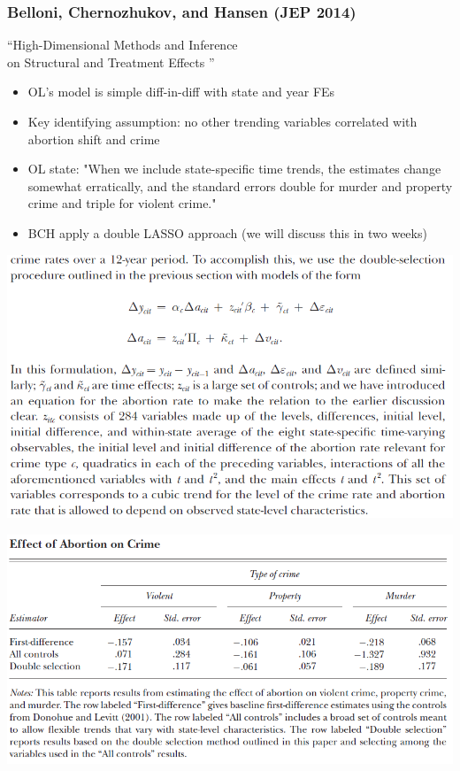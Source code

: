 \begin{frame}
    \frametitle{Belloni, Chernozhukov, and Hansen (JEP 2014)}
    \nocite{belloniJEP}
    ``High-Dimensional Methods and Inference \\ on Structural and Treatment Effects ''

\begin{itemize}
    \item OL's model is simple diff-in-diff with state and year FEs
    \item Key identifying assumption: no other trending variables correlated with abortion shift and crime
    \item OL state: "When we include state-specific time trends, the estimates change somewhat erratically, and the standard errors double for murder and property crime and triple for violent crime."
    \item BCH apply a double LASSO approach (we will discuss this in two weeks) 
\end{itemize}
\end{frame}

\begin{frame}
    \vspace{-10pt}
    \begin{center}
    \includegraphics[width=\textwidth]{./resources/BCHLevittVars}
    \end{center}
\end{frame}

\begin{frame}
    \vspace{-10pt}
    \begin{center}
    \includegraphics[width=\textwidth]{./resources/BCHLevittTable}
    \end{center}
\end{frame}

